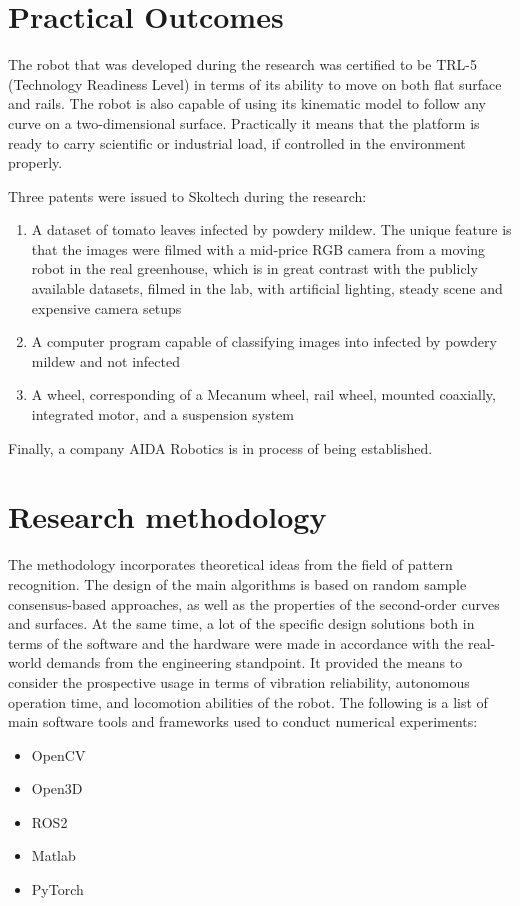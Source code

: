 \section{Practical Outcomes}

The robot that was developed during the research was certified to be TRL-5 (Technology Readiness Level) in terms of its ability to move on both flat surface and rails.
The robot is also capable of using its kinematic model to follow any curve on a two-dimensional surface.
Practically it means that the platform is ready to carry scientific or industrial load, if controlled in the environment properly.

Three patents were issued to Skoltech during the research:
\begin{enumerate}
    \item A dataset of tomato leaves infected by powdery mildew. The unique feature is that the images were filmed with a mid-price RGB camera from a moving robot in the real greenhouse, which is in great contrast with the publicly available datasets, filmed in the lab, with artificial lighting, steady scene and expensive camera setups
    \item A computer program capable of classifying images into infected by powdery mildew and not infected
    \item A wheel, corresponding of a Mecanum wheel, rail wheel, mounted coaxially, integrated motor, and a suspension system
\end{enumerate}

Finally, a company AIDA Robotics is in process of being established.

\section{Research methodology}

The methodology incorporates theoretical ideas from the field of pattern recognition.
The design of the main algorithms is based on random sample consensus-based approaches, as well as the properties of the second-order curves and surfaces.
At the same time, a lot of the specific design solutions both in terms of the software and the hardware were made in accordance with the real-world demands from the engineering standpoint.
It provided the means to consider the prospective usage in terms of vibration reliability, autonomous operation time, and locomotion abilities of the robot.
The following is a list of main software tools and frameworks used to conduct numerical experiments:
\begin{itemize}
    \item OpenCV
    \item Open3D
    \item ROS2
    \item Matlab
    \item PyTorch
\end{itemize}

